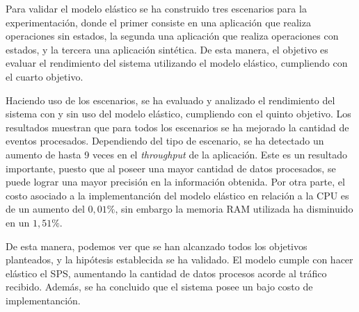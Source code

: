 Para validar el modelo elástico se ha construido tres escenarios para la experimentación, donde el primer consiste en una aplicación que realiza operaciones sin estados, la segunda una aplicación que realiza operaciones con estados, y la tercera una aplicación sintética. De esta manera, el objetivo es evaluar el rendimiento del sistema utilizando el modelo elástico, cumpliendo con el cuarto objetivo.


Haciendo uso de los escenarios, se ha evaluado y analizado el rendimiento del sistema con y sin uso del modelo elástico, cumpliendo con el quinto objetivo. Los resultados muestran que para todos los escenarios se ha mejorado la cantidad de eventos procesados. Dependiendo del tipo de escenario, se ha detectado un aumento de hasta 9 veces en el \textit{throughput} de la aplicación. Este es un resultado importante, puesto que al poseer una mayor cantidad de datos procesados, se puede lograr una mayor precisión en la información obtenida. Por otra parte, el costo asociado a la implementanción del modelo elástico en relación a la CPU es de un aumento del $0,01\%$, sin embargo la memoria RAM utilizada ha disminuido en un $1,51\%$.


De esta manera, podemos ver que se han alcanzado todos los objetivos planteados, y la hipótesis establecida se ha validado. El modelo cumple con hacer elástico el SPS, aumentando la cantidad de datos procesos acorde al tráfico recibido. Además, se ha concluido que el sistema posee un bajo costo de implementanción.

